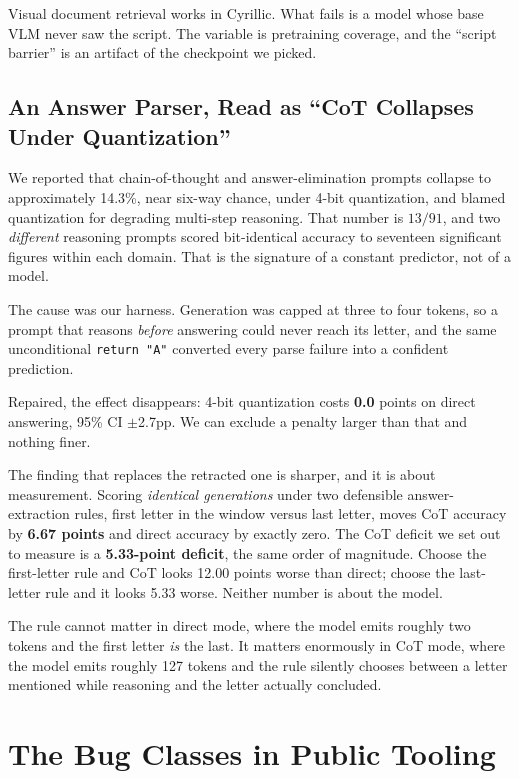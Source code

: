 \documentclass{article}
\begin{document}
Visual document retrieval works in Cyrillic. What fails is a model whose base VLM never saw the script. The variable is pretraining coverage, and the ``script barrier'' is an artifact of the checkpoint we picked.

\subsection{An Answer Parser, Read as ``CoT Collapses Under Quantization''}
\label{sec:cot}

We reported that chain-of-thought and answer-elimination prompts collapse to approximately 14.3\%, near six-way chance, under 4-bit quantization, and blamed quantization for degrading multi-step reasoning. That number is $13/91$, and two \emph{different} reasoning prompts scored bit-identical accuracy to seventeen significant figures within each domain. That is the signature of a constant predictor, not of a model.

The cause was our harness. Generation was capped at three to four tokens, so a prompt that reasons \emph{before} answering could never reach its letter, and the same unconditional \verb|return "A"| converted every parse failure into a confident prediction.

Repaired, the effect disappears: 4-bit quantization costs \textbf{0.0} points on direct answering, 95\% CI $\pm$2.7pp. We can exclude a penalty larger than that and nothing finer.

The finding that replaces the retracted one is sharper, and it is about measurement. Scoring \emph{identical generations} under two defensible answer-extraction rules, first letter in the window versus last letter, moves CoT accuracy by \textbf{6.67 points} and direct accuracy by exactly zero. The CoT deficit we set out to measure is a \textbf{5.33-point deficit}, the same order of magnitude. Choose the first-letter rule and CoT looks 12.00 points worse than direct; choose the last-letter rule and it looks 5.33 worse. Neither number is about the model.

The rule cannot matter in direct mode, where the model emits roughly two tokens and the first letter \emph{is} the last. It matters enormously in CoT mode, where the model emits roughly 127 tokens and the rule silently chooses between a letter mentioned while reasoning and the letter actually concluded.

\section{The Bug Classes in Public Tooling}
\label{sec:survey}
\end{document}
